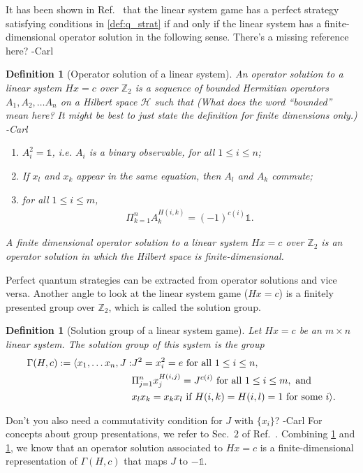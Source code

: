\documentclass[11pt,letterpaper]{article}
\DeclarePairedDelimiter{\ip}{\langle}{\rangle}
\newcommand{\Z}{\mathbb{Z}}
\newcommand{\calH}{\mathcal{H}}
\newcommand{\1}{\mathbb{1}}
\def\carl#1{{\color{blue} #1 -Carl}}
\newtheorem{definition}[theorem]{Definition}
\theoremstyle{definition}
\begin{document}
It has been shown in Ref.~\cite{cleve2014} that the linear system game has a perfect strategy 
satisfying conditions in \cref{def:q_strat} if and only if the linear system has a finite-dimensional
operator solution in the following sense.  \carl{There's a missing reference here?}
\begin{definition}[Operator solution of a linear system]
\label{def:op_sol}
	An operator solution to a linear system $Hx =c$ over $\Z_2$ is a sequence of bounded Hermitian 
	operators $A_1, A_2, \dots A_n$ on a Hilbert space $\calH$ such that \carl{(What does the word ``bounded'' mean here?  It might
	be best to just state the definition for finite dimensions only.)}
	\begin{enumerate}
		\item $A_i^2 = \1$, i.e. $A_i$ is a binary observable, for all $1 \leq i \leq n$;
		\item If $x_l$ and $x_k$ appear in the same equation, then $A_l$ and $A_k$ commute;
		\item for all $1 \leq i \leq m$,
		\begin{align*}
			\Pi_{k=1}^n A_k^{H(i,k)} = (-1)^{c(i)}\1.
		\end{align*}
	\end{enumerate}
	A finite dimensional operator solution to a linear system $Hx = c$ over $\Z_2$ is an operator
	solution in which the Hilbert space is finite-dimensional.
\end{definition}
Perfect quantum strategies can be extracted from operator solutions and vice versa.
Another angle to look at the linear system game ($Hx = c$) is a finitely presented group
over $\Z_2$, which is called the solution group.
\begin{definition}[Solution group of a linear system game]
	\label{def:presentation}
	Let $Hx = c$ be an $m \times n$  linear system. The solution group of this system
	is the group
	\begin{align*}
		\Gamma(H,c) := \ip{
		x_1,\dots x_n, J: &J^2 = x_i^2 = e \text{ for all }1 \leq i \leq n, \\
				& \Pi_{j=1}^n x_j^{H(i,j)} = J^{c(i)} \text{ for all } 1 \leq i \leq m, \text{ and } \\
				& x_l x_k = x_k x_l \text{ if } H(i,k) = H(i,l) = 1 \text{ for some } i
				} .
	\end{align*}
\end{definition}
\carl{Don't you also need a commutativity condition for $J$ with $\{ x_i \}$?}
For concepts about group presentations, we refer to Sec.~$2$ of Ref.~\cite{slofstra2017}.
Combining \cref{def:op_sol} and \cref{def:presentation}, we know that an operator solution associated to $Hx =c$ is 
a finite-dimensional representation of $\Gamma(H,c)$ that maps $J$ to $-\1$.
\end{document}
